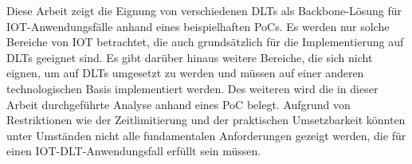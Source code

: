 \documentclass[
    ngerman,american
    ]{scrartcl}
\newcommand{\lang}{de}
\begin{document}
\begin{description}[style=unboxed]

            \item [\questionFour{\lang}]
		
		Diese Arbeit zeigt die Eignung von verschiedenen DLTs als Backbone-Lösung für IOT-Anwendungsfälle anhand eines beispielhaften PoCs. Es werden nur solche Bereiche von IOT betrachtet, die auch grundsätzlich für die Implementierung auf DLTs geeignet sind. Es gibt darüber hinaus weitere Bereiche, die sich nicht eignen, um auf DLTs umgesetzt zu werden und müssen auf einer anderen technologischen Basis implementiert werden. Des weiteren wird die in dieser Arbeit durchgeführte Analyse anhand eines PoC belegt. Aufgrund von Restriktionen wie der Zeitlimitierung und der praktischen Umsetzbarkeit könnten unter Umständen nicht alle fundamentalen Anforderungen gezeigt werden, die für einen IOT-DLT-Anwendungsfall erfüllt sein müssen.

        \end{description}
\end{document}
